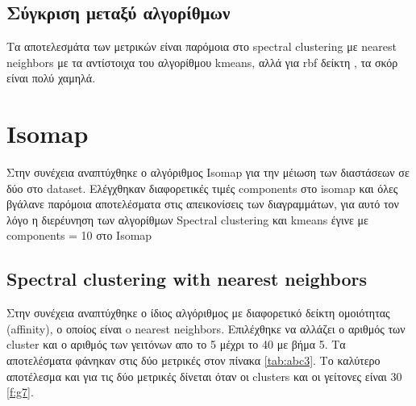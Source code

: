 \subsection{Σύγκριση μεταξύ αλγορίθμων}
Τα αποτελεσμάτα των μετρικών είναι παρόμοια στο spectral clustering με nearest neighbors με τα αντίστοιχα του αλγορίθμου kmeans, αλλά για rbf δείκτη , τα σκόρ είναι πολύ χαμηλά.
\clearpage
\section{Isomap}
Στην συνέχεια αναπτύχθηκε ο αλγόριθμος Isomap για την μέιωση των διαστάσεων σε δύο στο dataset. Ελέγχθηκαν διαφορετικές τιμές components στο isomap και όλες βγάλανε παρόμοια αποτελέσματα στις απεικονίσεις των διαγραμμάτων, για αυτό τον λόγο η διερέυνηση των αλγορίθμων Spectral clustering και kmeans έγινε με components = 10 στο Isomap




\subsection{Spectral clustering with nearest neighbors}

Στην συνέχεια αναπτύχθηκε ο ίδιος αλγόριθμος με διαφορετικό δείκτη ομοιότητας (affinity), ο οποίος είναι o nearest neighbors. Επιλέχθηκε να αλλάζει ο αριθμός των cluster και ο αριθμός των γειτόνων απο το 5 μέχρι το 40 με βήμα 5. Τα αποτελέσματα φάνηκαν στις δύο μετρικές στον πίνακα \ref{tab:abc3}. Το καλύτερο αποτέλεσμα και για τις δύο μετρικές δίνεται όταν οι clusters και οι γείτονες είναι 30 \ref{f:g7}.

